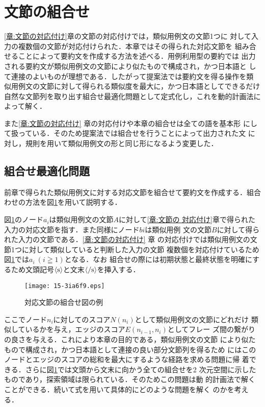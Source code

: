\documentclass[japanese]{jnlp_1.4}
\begin{document}
\section{文節の組合せ}\label{章:文節の組合せ}

\ref{章:文節の対応付け}章の文節の対応付けでは，類似用例文の文節1つに
対して入力の複数個の文節が対応付けられた．本章ではその得られた対応文節を
組み合せることによって要約文を作成する方法を述べる．用例利用型の要約では
出力される要約文が類似用例文の文節により似たもので構成され，かつ日本語と
して連接のよいものが理想である．したがって提案法では要約文を得る操作を類
似用例文の文節に対して得られる類似度を最大に，かつ日本語としてできるだけ
自然な文節列を取り出す組合せ最適化問題として定式化し，これを動的計画法に
よって解く．

また\ref{章:文節の対応付け} 章の対応付けや本章の組合せは全ての語を基本形
にして扱っている．そのため提案法では組合せを行うことによって出力された文
に対し，規則を用いて類似用例文の形と同じ形になるよう変更した．


\subsection{組合せ最適化問題}\label{節:組合せ最適化問題}

前章で得られた類似用例文に対する対応文節を組合せて要約文を作成する．組合
わせの方法を図\ref{図:組合せ}を用いて説明する．

図\ref{図:組合せ}のノード$a_i$は類似用例文の文節$A$に対して\ref{章:文節の
対応付け}章で得られた入力の対応文節を指す．また同様にノード$bi$は類似用例
文の文節$B$に対して得られた入力の文節である．\ref {章:文節の対応付け} 章
の対応付けでは類似用例文の文節1つに対して類似していると判断した入力の文節
複数個を対応付けているため図\ref{図:組合せ}では$a_i\ (i \geqq 1)$となる．なお
組合せの際には初期状態と最終状態を明確にするため文頭記号$\langle
\rm{s}\rangle$と文末$\langle/\rm{s}\rangle$を挿入する．

\begin{figure}[t]
\begin{center}
\texttt{[image: 15-3ia6f9.eps]}
\caption{対応文節の組合せ図の例} \label{図:組合せ}
\end{center}
\vspace{-1\baselineskip}
\end{figure}


ここでノード$n_i$に対してのスコア$N(n_i)$として類似用例文の文節にどれだけ
類似しているかを与え，エッジのスコア$E(n_{i-1},n_i)$としてフレー
ズ間の繋がりの良さを与える．これにより本章の目的である，類似用例文の文節
により似たもので構成され，かつ日本語として連接の良い部分文節列を得るため
にはこのノードとエッジのスコアの総和を最大にするような経路を求める問題に帰
着できる．さらに図\ref{図:組合せ}では文頭から文末に向かう全ての組合せを2
次元空間に示したものであり，探索領域は限られている．そのためこの問題は動
的計画法で解くことができる．続いて式を用いて具体的にどのような問題を解く
のかを考える．
\end{document}
